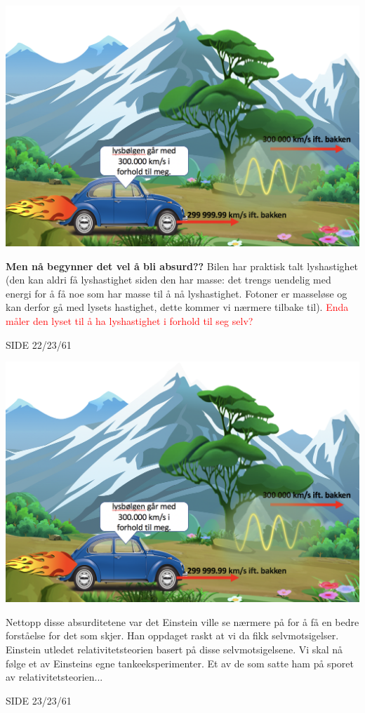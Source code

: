 \documentclass{beamer}
\begin{document}
\begin{frame}
{
\centerline{\includegraphics[scale=0.3]{media/klassrel11.png}}
{\bf Men nå begynner det vel å bli absurd??} Bilen har praktisk talt lyshastighet (den kan aldri få lyshastighet siden den har masse: det trengs uendelig med energi for å få noe som har masse til å nå lyshastighet. Fotoner er masseløse og kan derfor gå med lysets hastighet, dette kommer vi nærmere tilbake til). \textcolor{red}{Enda måler den lyset til å ha lyshastighet i forhold til seg selv?}
}{SIDE 22/23/61}

{
\centerline{\includegraphics[scale=0.3]{media/klassrel11.png}}
Nettopp disse absurditetene var det Einstein ville se nærmere på for å få en bedre forståelse for det som skjer. Han oppdaget raskt at vi da fikk selvmotsigelser. Einstein utledet relativitetsteorien basert på disse selvmotsigelsene. Vi skal nå følge et av Einsteins egne tankeeksperimenter. Et av de som satte ham på sporet av relativitetsteorien...
}{SIDE 23/23/61}



\end{frame}
\end{document}
